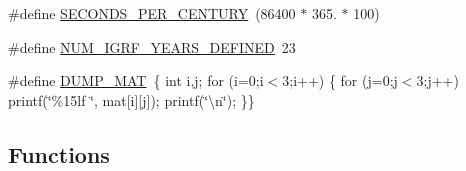 \begin{DoxyCompactItemize}
\item 
\#define \hyperlink{cxform-manual_8c_abdf8c3704a0d990a87e48f1a763d405f}{S\-E\-C\-O\-N\-D\-S\-\_\-\-P\-E\-R\-\_\-\-C\-E\-N\-T\-U\-R\-Y}~(86400 $\ast$ 365. $\ast$ 100)
\item 
\#define \hyperlink{cxform-manual_8c_a73ea55604473e02996222de081a76e7f}{N\-U\-M\-\_\-\-I\-G\-R\-F\-\_\-\-Y\-E\-A\-R\-S\-\_\-\-D\-E\-F\-I\-N\-E\-D}~23
\item 
\#define \hyperlink{cxform-manual_8c_a78e3086280b9a0d341f415a8aef06c55}{D\-U\-M\-P\-\_\-\-M\-A\-T}~\{ int i,j; for (i=0;i$<$3;i++) \{ for (j=0;j$<$3;j++) printf(\char`\"{}\%15lf \char`\"{}, mat\mbox{[}i\mbox{]}\mbox{[}j\mbox{]}); printf(\char`\"{}\textbackslash{}n\char`\"{}); \}\}
\end{DoxyCompactItemize}
\subsection*{Functions}
